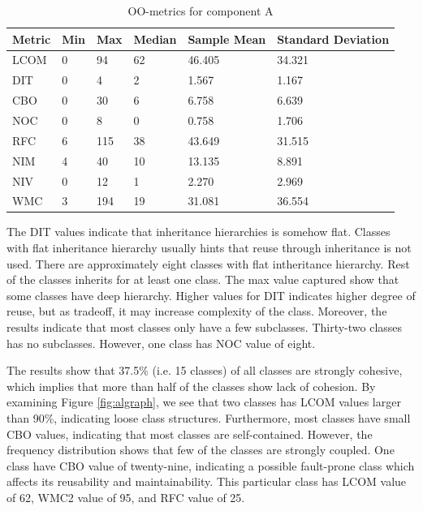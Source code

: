 \begin{table}[]
\centering
\caption{OO-metrics for component A}
\label{tab:oometrics-al}
\begin{tabular}{|l|l|l|l|l|l|}
\hline
\textbf{Metric} & \textbf{Min} & \textbf{Max} & \textbf{Median} & \textbf{Sample Mean} & \textbf{Standard Deviation} \\ \hline
LCOM            & 0            & 94           & 62              & 46.405               & 34.321                      \\ \hline
DIT             & 0            & 4            & 2               & 1.567                & 1.167                       \\ \hline
CBO             & 0            & 30           & 6               & 6.758                & 6.639                       \\ \hline
NOC             & 0            & 8            & 0               & 0.758                & 1.706                       \\ \hline
RFC             & 6            & 115          & 38            & 43.649               & 31.515                      \\ \hline
NIM             & 4            & 40           & 10              & 13.135                 & 8.891                       \\ \hline
NIV             & 0            & 12           & 1               & 2.270                  & 2.969                       \\ \hline
WMC           & 3            & 194          & 19              & 31.081                 & 36.554                      \\ \hline
\end{tabular}
\end{table}

The DIT values indicate that inheritance hierarchies is somehow flat. Classes with flat inheritance hierarchy usually hints that reuse through inheritance is not used. There are approximately eight classes with flat intheritance hierarchy. Rest of the classes inherits for at least one class. The max value captured show that some classes have deep hierarchy. Higher values for DIT indicates higher degree of reuse, but as tradeoff, it may increase complexity of the class. Moreover, the results indicate that most classes only have a few subclasses. Thirty-two classes has no subclasses. However, one class has NOC value of eight. 

The results show that 37.5\% (i.e. 15 classes) of all classes are strongly cohesive, which implies that more than half of the classes show lack of cohesion. By examining Figure \ref{fig:algraph}, we see that two classes has LCOM values larger than 90\%, indicating loose class structures. Furthermore, most classes have small CBO values, indicating that most classes are self-contained. However, the frequency distribution shows that few of the classes are strongly coupled. One class have CBO value of twenty-nine, indicating a possible fault-prone class which affects its reusability and maintainability. This particular class has LCOM value of 62, WMC2 value of 95, and RFC value of 25.


